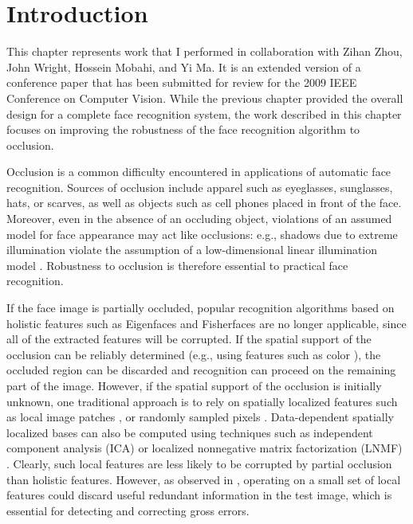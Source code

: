 \section{Introduction} 





This chapter represents work that I performed in collaboration with Zihan Zhou,
John Wright, Hossein Mobahi, and Yi Ma.  It is an extended version of a
conference paper that has been submitted for review for the 2009 IEEE
Conference on Computer Vision.  While the previous chapter provided the overall
design for a complete face recognition system, the work described in this
chapter focuses on improving the robustness of the face recognition algorithm
to occlusion.

Occlusion is a common difficulty encountered in applications of automatic face
recognition. Sources of occlusion include apparel such as  eyeglasses,
sunglasses, hats, or scarves, as well as objects such as cell phones placed in
front of the face. Moreover, even in the absence of an occluding object,
violations of an assumed model for face appearance may act like occlusions:
e.g., shadows due to extreme illumination violate the assumption of a
low-dimensional linear illumination model \cite{Basri2003-PAMI}. Robustness to
occlusion is therefore essential to practical face recognition.

If the face image is partially occluded, popular recognition algorithms based
on holistic features such as Eigenfaces and Fisherfaces
\cite{Turk1991-CVPR,Belhumeur1997-PAMI} are no longer applicable, since all of
the extracted features will be corrupted. If the spatial support of the
occlusion can be reliably determined (e.g., using features such as color
\cite{Jia2008-FGR,Jia2009-CVPR}), the occluded region can be discarded and
recognition can proceed on the remaining part of the image. However, if the
spatial support of the occlusion is initially unknown, one traditional approach
is to rely on spatially localized features such as local image patches
\cite{Martinez-02,Pentland1994-CVPR,Ahonen2006-PAMI}, or randomly sampled
pixels \cite{Leonardis2000-CVIU,Fidler2006-PAMI}. Data-dependent spatially
localized bases can also be computed using techniques such as independent
component analysis (ICA) or localized nonnegative matrix factorization (LNMF)
\cite{KimJ2005-PAMI,LiS2001-CVPR}. Clearly, such local features are less likely
to be corrupted by partial occlusion than holistic features. However, as
observed in \cite{Wright2009-PAMI}, operating on a small set of local features
could discard useful redundant information in the test image, which is
essential for detecting and correcting gross errors.

